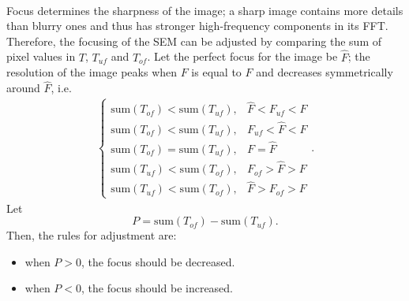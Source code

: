 \documentclass[12pt, twocolumn]{report}
\begin{document}
\paragraph{}
Focus determines the sharpness of the image; a sharp image contains more details than blurry ones and thus has stronger high-frequency components in its FFT. Therefore, the focusing of the SEM can be adjusted by comparing the sum of pixel values in $T$, $T_{uf}$ and $T_{of}$. Let the perfect focus for the image be $\hat{F}$; the resolution of the image peaks when $F$ is equal to $\hat{F}$ and decreases symmetrically around $\hat{F}$, i.e.
\begin{align*}
\begin{cases}
    \text{sum}(T_{of}) < \text{sum}(T_{uf}), & \hat{F} < F_{uf} < F\\
    \text{sum}(T_{of}) < \text{sum}(T_{uf}), & F_{uf} < \hat{F} < F \\
    \text{sum}(T_{of}) = \text{sum}(T_{uf}), & F = \hat{F} \\
    \text{sum}(T_{uf}) < \text{sum}(T_{of}), & F_{of} > \hat{F} > F \\
    \text{sum}(T_{uf}) < \text{sum}(T_{of}), & \hat{F} > F_{of} > F
\end{cases}.
\end{align*}
Let
\begin{equation}
    P = \text{sum}(T_{of}) - \text{sum}(T_{uf}).
\end{equation}
Then, the rules for adjustment are:
\begin{itemize}
    \item when $P>0$, the focus should be decreased.
    \item when $P<0$, the focus should be increased.
\end{itemize}
\end{document}
